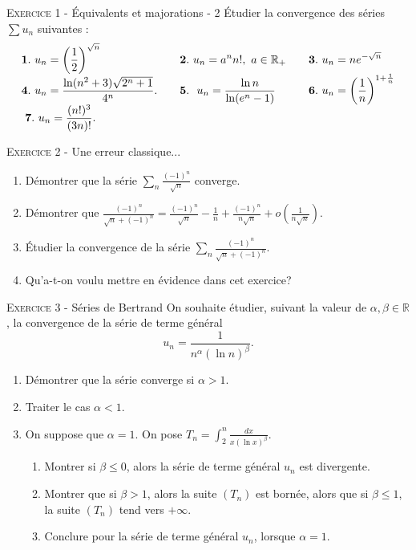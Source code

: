 \documentclass[11pt]{article}
\begin{document}
 

\begin{center}\textsc{{\huge }}\end{center}



\vskip0.3cm\noindent\textsc{Exercice 1} - Équivalents et majorations - 2
\vskip0.2cm
\'Etudier la convergence des séries $\sum u_n$ suivantes :
$$\begin{array}{lllll}
\displaystyle \mathbf 1.\ u_n=\left(\frac{1}{2}\right)^{\sqrt{n}}&&
\displaystyle \mathbf 2.\ u_n=a^n n!,\ a\in\mathbb R_+&&\displaystyle \mathbf 3. \ u_n=ne^{-\sqrt n}\\
\displaystyle {\bf 4.}
\ u_n=\frac{\ln(n^2+3)\sqrt{2^n+1}}{4^n}.&&
\displaystyle {\bf 5}.\ 
\ u_n=\frac{\ln n}{\ln(e^n -1)}&&
\displaystyle \mathbf 6.\ u_n=\left(\frac 1n\right)^{1+\frac 1n}\\
\ \displaystyle \mathbf 7.\ u_n=\frac{(n!)^3}{(3n)!}.
\end{array}$$





\vskip0.3cm\noindent\textsc{Exercice 2} - Une erreur classique...
\vskip0.2cm
\begin{enumerate}
\item Démontrer que la série $\sum_n \frac{(-1)^n}{\sqrt n}$ converge.
\item Démontrer que $\displaystyle \frac{(-1)^n}{\sqrt n+(-1)^n}=\frac{(-1)^n}{\sqrt n}-\frac1n+\frac{(-1)^n}{n\sqrt
n}+o\left(\frac 1{n\sqrt n}\right)$.
\item \'Etudier la convergence de la série $\displaystyle \sum_n \frac{(-1)^n}{\sqrt n+(-1)^n}$.
\item Qu'a-t-on voulu mettre en évidence dans cet exercice?
\end{enumerate}




\vskip0.3cm\noindent\textsc{Exercice 3} - Séries de Bertrand
\vskip0.2cm
On souhaite étudier, suivant la valeur de $\alpha,\beta\in\mathbb R$, la convergence de la série de terme général
$$u_n=\frac{1}{n^\alpha(\ln n)^\beta}.$$
\begin{enumerate}
\item Démontrer que la série converge si $\alpha>1$.
\item Traiter le cas $\alpha<1$.
\item On suppose que $\alpha=1$. 
On pose $T_n=\int_2^n \frac{dx}{x(\ln x)^\beta}$.
\begin{enumerate}
\item Montrer si $\beta\leq 0$, alors la série de terme général $u_n$ est divergente.
\item Montrer que si $\beta>1$, alors la suite $(T_n)$ est bornée, alors que si $\beta\leq 1$, la suite $(T_n)$ tend vers $+\infty$.
\item Conclure pour la série de terme général $u_n$, lorsque $\alpha=1$.
\end{enumerate}
\end{enumerate}
\end{document}
